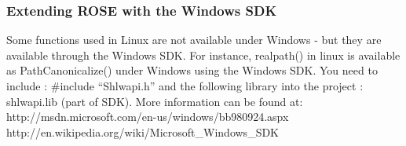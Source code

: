 \subsubsection{Extending ROSE with the Windows SDK}

Some functions used in Linux are not available under Windows - but they are available through the Windows SDK. For instance, realpath() in linux is available as PathCanonicalize() under Windows using the Windows SDK. You need to include : \#include ``Shlwapi.h'' and the following library into the project : shlwapi.lib (part of SDK). More information can be found at: http://msdn.microsoft.com/en-us/windows/bb980924.aspx http://en.wikipedia.org/wiki/Microsoft\_Windows\_SDK





